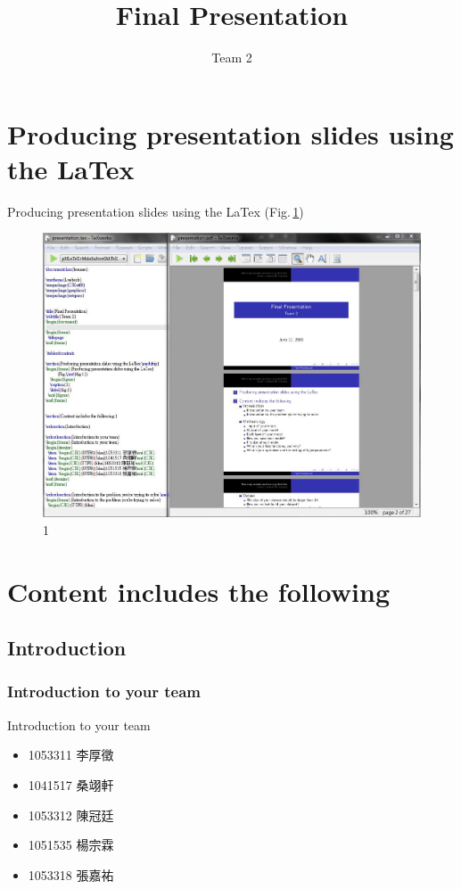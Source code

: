 \documentclass{beamer}
\title{Final Presentation}
\subtitle{Team 2}
\begin{document}
\begin{frame}
  \titlepage
\end{frame}

 \tableofcontents

\section{Producing presentation slides using the LaTex \medskip}
\begin{frame}{Producing presentation slides using the LaTex}
	(Fig.\,\ref{fig:1})
    \begin{figure}
  \includegraphics[width=0.7\linewidth]{latex.jpg}
    \caption{1}
    \label{fig:1}
  \end{figure}
\end{frame}


\section{Content includes the following }

\subsection{Introduction}

\subsubsection{Introduction to your team}
\begin{frame}{Introduction to your team}
\begin{itemize}
  \item  \begin{CJK}{UTF8}{bkai}1053311 李厚徵\end{CJK}
  \item  \begin{CJK}{UTF8}{bkai}1041517 桑翊軒\end{CJK}
  \item \begin{CJK}{UTF8}{bkai}1053312 陳冠廷\end{CJK}
  \item  \begin{CJK}{UTF8}{bkai}1051535 楊宗霖\end{CJK}
  \item  \begin{CJK}{UTF8}{bkai}1053318 張嘉祐\end{CJK}
\end{itemize}
\end{frame}
\end{document}
